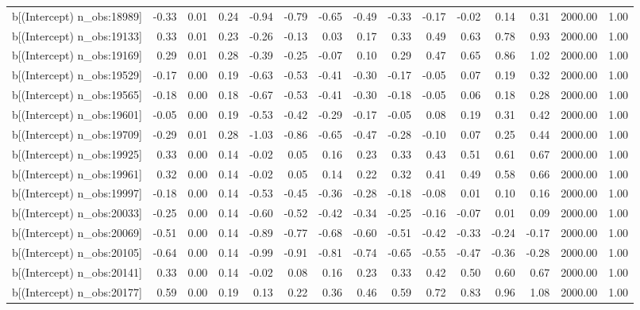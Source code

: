 \begin{table}[ht]
\begin{tabular}{rrrrrrrrrrrrrrr}
  b[(Intercept) n\_obs:18989] & -0.33 & 0.01 & 0.24 & -0.94 & -0.79 & -0.65 & -0.49 & -0.33 & -0.17 & -0.02 & 0.14 & 0.31 & 2000.00 & 1.00 \\ 
  b[(Intercept) n\_obs:19133] & 0.33 & 0.01 & 0.23 & -0.26 & -0.13 & 0.03 & 0.17 & 0.33 & 0.49 & 0.63 & 0.78 & 0.93 & 2000.00 & 1.00 \\ 
  b[(Intercept) n\_obs:19169] & 0.29 & 0.01 & 0.28 & -0.39 & -0.25 & -0.07 & 0.10 & 0.29 & 0.47 & 0.65 & 0.86 & 1.02 & 2000.00 & 1.00 \\ 
  b[(Intercept) n\_obs:19529] & -0.17 & 0.00 & 0.19 & -0.63 & -0.53 & -0.41 & -0.30 & -0.17 & -0.05 & 0.07 & 0.19 & 0.32 & 2000.00 & 1.00 \\ 
  b[(Intercept) n\_obs:19565] & -0.18 & 0.00 & 0.18 & -0.67 & -0.53 & -0.41 & -0.30 & -0.18 & -0.05 & 0.06 & 0.18 & 0.28 & 2000.00 & 1.00 \\ 
  b[(Intercept) n\_obs:19601] & -0.05 & 0.00 & 0.19 & -0.53 & -0.42 & -0.29 & -0.17 & -0.05 & 0.08 & 0.19 & 0.31 & 0.42 & 2000.00 & 1.00 \\ 
  b[(Intercept) n\_obs:19709] & -0.29 & 0.01 & 0.28 & -1.03 & -0.86 & -0.65 & -0.47 & -0.28 & -0.10 & 0.07 & 0.25 & 0.44 & 2000.00 & 1.00 \\ 
  b[(Intercept) n\_obs:19925] & 0.33 & 0.00 & 0.14 & -0.02 & 0.05 & 0.16 & 0.23 & 0.33 & 0.43 & 0.51 & 0.61 & 0.67 & 2000.00 & 1.00 \\ 
  b[(Intercept) n\_obs:19961] & 0.32 & 0.00 & 0.14 & -0.02 & 0.05 & 0.14 & 0.22 & 0.32 & 0.41 & 0.49 & 0.58 & 0.66 & 2000.00 & 1.00 \\ 
  b[(Intercept) n\_obs:19997] & -0.18 & 0.00 & 0.14 & -0.53 & -0.45 & -0.36 & -0.28 & -0.18 & -0.08 & 0.01 & 0.10 & 0.16 & 2000.00 & 1.00 \\ 
  b[(Intercept) n\_obs:20033] & -0.25 & 0.00 & 0.14 & -0.60 & -0.52 & -0.42 & -0.34 & -0.25 & -0.16 & -0.07 & 0.01 & 0.09 & 2000.00 & 1.00 \\ 
  b[(Intercept) n\_obs:20069] & -0.51 & 0.00 & 0.14 & -0.89 & -0.77 & -0.68 & -0.60 & -0.51 & -0.42 & -0.33 & -0.24 & -0.17 & 2000.00 & 1.00 \\ 
  b[(Intercept) n\_obs:20105] & -0.64 & 0.00 & 0.14 & -0.99 & -0.91 & -0.81 & -0.74 & -0.65 & -0.55 & -0.47 & -0.36 & -0.28 & 2000.00 & 1.00 \\ 
  b[(Intercept) n\_obs:20141] & 0.33 & 0.00 & 0.14 & -0.02 & 0.08 & 0.16 & 0.23 & 0.33 & 0.42 & 0.50 & 0.60 & 0.67 & 2000.00 & 1.00 \\ 
  b[(Intercept) n\_obs:20177] & 0.59 & 0.00 & 0.19 & 0.13 & 0.22 & 0.36 & 0.46 & 0.59 & 0.72 & 0.83 & 0.96 & 1.08 & 2000.00 & 1.00 \\ 

\end{tabular}
\end{table}
